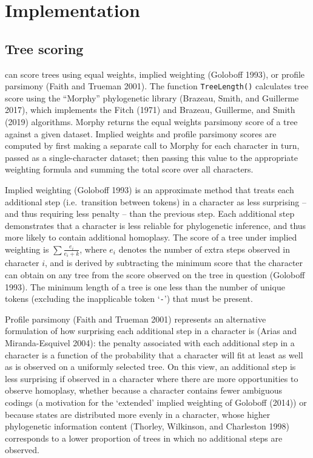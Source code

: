 \hypertarget{implementation}{%
\section{Implementation}\label{implementation}}

\hypertarget{tree-scoring}{%
\subsection{Tree scoring}\label{tree-scoring}}

 can score trees using equal weights, implied weighting
(Goloboff 1993), or profile parsimony (Faith and Trueman 2001). The function \texttt{TreeLength()}
calculates tree score using the ``Morphy'' phylogenetic library (Brazeau, Smith, and Guillerme 2017),
which implements the Fitch (1971) and Brazeau, Guillerme, and Smith (2019) algorithms. Morphy returns the
equal weights parsimony score of a tree against a given dataset. Implied weights
and profile parsimony scores are computed by first making a separate call to
Morphy for each character in turn, passed as a single-character dataset; then
passing this value to the appropriate weighting formula and summing the total
score over all characters.

Implied weighting (Goloboff 1993) is an approximate method that treats each
additional step (i.e.~transition between tokens) in a character as less
surprising -- and thus requiring less penalty -- than the previous step. Each
additional step demonstrates that a character is less reliable for phylogenetic
inference, and thus more likely to contain additional homoplasy. The score of a
tree under implied weighting is \(\sum{\frac{e_i}{e_i+k}}\), where \(e_i\) denotes
the number of extra steps observed in character \(i\), and is derived by
subtracting the minimum score that the character can obtain on any tree from the
score observed on the tree in question (Goloboff 1993). The minimum length of a
tree is one less than the number of unique tokens (excluding the inapplicable
token `\texttt{-}') that must be present.

Profile parsimony (Faith and Trueman 2001) represents an alternative formulation of how
surprising each additional step in a character is (Arias and Miranda-Esquivel 2004): the penalty
associated with each additional step in a character is a function of the
probability that a character will fit at least as well as is observed on a
uniformly selected tree. On this view, an additional step is less surprising if
observed in a character where there are more opportunities to observe homoplasy,
whether because a character contains fewer ambiguous codings (a motivation for
the `extended' implied weighting of Goloboff (2014)) or because states are
distributed more evenly in a character, whose higher phylogenetic information
content (Thorley, Wilkinson, and Charleston 1998) corresponds to a lower proportion of trees in which no
additional steps are observed.

